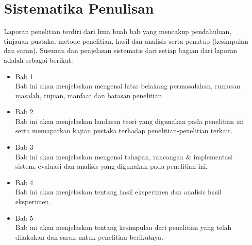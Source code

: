 \section{Sistematika Penulisan}
Laporan penelitian terdiri dari lima buah bab yang mencakup pendahuluan, tinjauan pustaka, metode penelitian, hasil dan analisis serta penutup (kesimpulan dan saran). Susunan dan penjelasan sistematis dari setiap bagian dari laporan adalah sebagai berikut:

\begin{itemize}
	\item Bab 1 \babSatu \\
	Bab ini akan menjelaskan mengenai latar belakang permasalahan, rumusan masalah, tujuan, manfaat dan batasan penelitian.
	
	\item Bab 2 \babDua \\
	Bab ini akan menjelaskan landasan teori yang digunakan pada penelitian ini serta memaparkan kajian pustaka terhadap penelitian-penelitian terkait.
	
	\item Bab 3 \babTiga \\
	Bab ini akan menjelaskan mengenai tahapan, rancangan \& implementasi sistem, evaluasi dan analisis yang digunakan pada penelitian ini.
	
	\item Bab 4 \babEmpat \\
	Bab ini akan menjelaskan tentang hasil eksperimen dan analisis hasil eksperimen.
	
	\item Bab 5 \babLima \\
	Bab ini akan menjelaskan tentang kesimpulan dari penelitian yang telah dilakukan dan saran untuk penelitian berikutnya.
\end{itemize}


